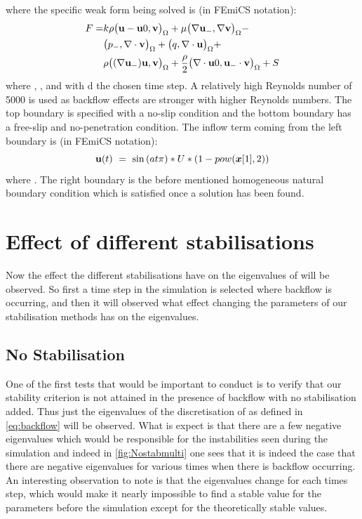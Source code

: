 where the specific weak form being solved is (in FEmiCS notation):
\begin{align*}
    F = &k\rho\big({\textbf{u}} - {\textbf{u}} 0,{\textbf{v}}\big)_{\Omega} + \mu\big(\nabla{\textbf{u}}_-,\nabla{\textbf{v}}\big)_{\Omega} -\\ &\big(p_-,\nabla\cdot{\textbf{v}}\big)_{\Omega} + \big(q,\nabla\cdot{\textbf{u}}\big)_{\Omega} +\\ &\rho\big(\qty(\nabla{\textbf{u}}_-){\textbf{u}},{\textbf{v}}\big)_{\Omega} + \frac{\rho}{2}\big(\nabla\cdot{\textbf{u}} 0,{\textbf{u}}_-\cdot{\textbf{v}}\big)_{\Omega} + S
\end{align*}
where , ,  and  with d the chosen time step. A relatively high Reynolds number of 5000 is used as backflow effects are stronger with higher Reynolds numbers. The top boundary is specified with a no-slip condition and the bottom boundary has a free-slip and no-penetration condition. The inflow term coming from the left boundary is (in FEmiCS notation):
\[
    {\textbf{u}}(t)~=~\sin\qty(at\pi)*U*(1 - pow(\bm{x}[1], 2))
\]
where . The right boundary is the before mentioned homogeneous natural boundary condition which is satisfied once a solution has been found.

\section{Effect of different stabilisations}
Now the effect the different stabilisations have on the eigenvalues of  will be observed. So first a time step in the simulation is selected where backflow is occurring, and then it will observed what effect changing the parameters of our stabilisation methods has on the eigenvalues.

\subsection{No Stabilisation}
One of the first tests that would be important to conduct is to verify that our stability criterion is not attained in the presence of backflow with no stabilisation added. Thus just the eigenvalues of the discretisation of  as defined in \autoref{eq:backflow} will be observed. What is expect is that there are a few negative eigenvalues which would be responsible for the instabilities seen during the simulation and indeed in \autoref{fig:Nostabmulti} one sees that it is indeed the case that there are negative eigenvalues for various times when there is backflow occurring. An interesting observation to note is that the eigenvalues change for each times step, which would make it nearly impossible to find a stable value for the parameters before the simulation except for the theoretically stable values.

